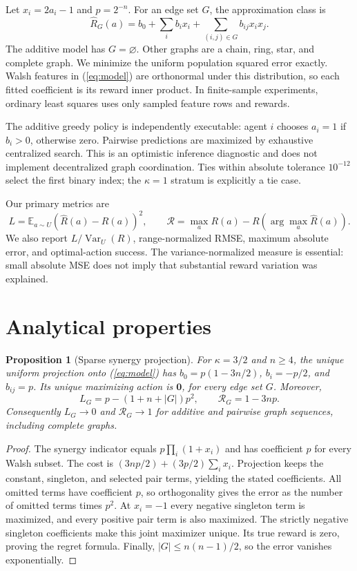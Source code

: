 \documentclass[10pt]{article}
\newtheorem{proposition}{Proposition}
\newcommand{\E}{\mathbb{E}}
\begin{document}
Let $x_i=2a_i-1$ and $p=2^{-n}$. For an edge set $G$, the approximation class is
\begin{equation}
 \widehat R_G(a)=b_0+\sum_i b_i x_i+\sum_{(i,j)\in G}b_{ij}x_ix_j.\label{eq:model}
\end{equation}
The additive model has $G=\varnothing$. Other graphs are a chain, ring, star, and complete graph. We minimize the uniform population squared error exactly. Walsh features in (\ref{eq:model}) are orthonormal under this distribution, so each fitted coefficient is its reward inner product. In finite-sample experiments, ordinary least squares uses only sampled feature rows and rewards.

The additive greedy policy is independently executable: agent $i$ chooses $a_i=1$ if $b_i>0$, otherwise zero. Pairwise predictions are maximized by exhaustive centralized search. This is an optimistic inference diagnostic and does not implement decentralized graph coordination. Ties within absolute tolerance $10^{-12}$ select the first binary index; the $\kappa=1$ stratum is explicitly a tie case.

Our primary metrics are
\begin{equation}
 L=\E_{a\sim U}(\widehat R(a)-R(a))^2,\qquad
 \mathcal R=\max_a R(a)-R(\arg\max_a\widehat R(a)).
\end{equation}
We also report $L/\operatorname{Var}_U(R)$, range-normalized RMSE, maximum absolute error, and optimal-action success. The variance-normalized measure is essential: small absolute MSE does not imply that substantial reward variation was explained.

\section{Analytical properties}
\begin{proposition}[Sparse synergy projection]\label{prop:main}
For $\kappa=3/2$ and $n\geq4$, the unique uniform projection onto (\ref{eq:model}) has $b_0=p(1-3n/2)$, $b_i=-p/2$, and $b_{ij}=p$. Its unique maximizing action is $\mathbf0$, for every edge set $G$. Moreover,
\begin{equation}
 L_G=p-(1+n+|G|)p^2,\qquad \mathcal R_G=1-3np.
\end{equation}
Consequently $L_G\to0$ and $\mathcal R_G\to1$ for additive and pairwise graph sequences, including complete graphs.
\end{proposition}
\begin{proof}
The synergy indicator equals $p\prod_i(1+x_i)$ and has coefficient $p$ for every Walsh subset. The cost is $(3np/2)+(3p/2)\sum_i x_i$. Projection keeps the constant, singleton, and selected pair terms, yielding the stated coefficients. All omitted terms have coefficient $p$, so orthogonality gives the error as the number of omitted terms times $p^2$. At $x_i=-1$ every negative singleton term is maximized, and every positive pair term is also maximized. The strictly negative singleton coefficients make this joint maximizer unique. Its true reward is zero, proving the regret formula. Finally, $|G|\leq n(n-1)/2$, so the error vanishes exponentially.
\end{proof}
\end{document}
